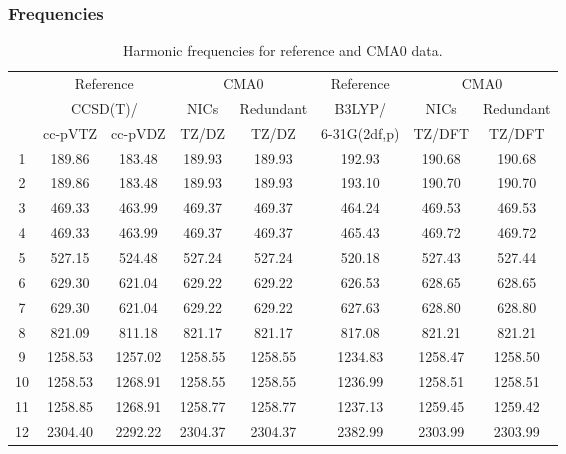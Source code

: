 \documentclass[10pt,oneside]{article}
\begin{document}
\begin{table}[h!]
\subsubsection*{Frequencies}
\centering
\caption{Harmonic frequencies for reference and CMA0 data.}
\begin{tabular}{cccccccc}
\toprule
{} & \multicolumn{2}{c}{Reference} & \multicolumn{2}{c}{CMA0} &    Reference & \multicolumn{2}{c}{CMA0} \\
{} & \multicolumn{2}{c}{CCSD(T)/} &    NICs &  Redundant &       B3LYP/ &    NICs & Redundant \\
{} &   cc-pVTZ & cc-pVDZ &   TZ/DZ &      TZ/DZ & 6-31G(2df,p) &  TZ/DFT &    TZ/DFT \\
\midrule
1  &    189.86 &  183.48 &  189.93 &     189.93 &       192.93 &  190.68 &    190.68 \\
2  &    189.86 &  183.48 &  189.93 &     189.93 &       193.10 &  190.70 &    190.70 \\
3  &    469.33 &  463.99 &  469.37 &     469.37 &       464.24 &  469.53 &    469.53 \\
4  &    469.33 &  463.99 &  469.37 &     469.37 &       465.43 &  469.72 &    469.72 \\
5  &    527.15 &  524.48 &  527.24 &     527.24 &       520.18 &  527.43 &    527.44 \\
6  &    629.30 &  621.04 &  629.22 &     629.22 &       626.53 &  628.65 &    628.65 \\
7  &    629.30 &  621.04 &  629.22 &     629.22 &       627.63 &  628.80 &    628.80 \\
8  &    821.09 &  811.18 &  821.17 &     821.17 &       817.08 &  821.21 &    821.21 \\
9  &   1258.53 & 1257.02 & 1258.55 &    1258.55 &      1234.83 & 1258.47 &   1258.50 \\
10 &   1258.53 & 1268.91 & 1258.55 &    1258.55 &      1236.99 & 1258.51 &   1258.51 \\
11 &   1258.85 & 1268.91 & 1258.77 &    1258.77 &      1237.13 & 1259.45 &   1259.42 \\
12 &   2304.40 & 2292.22 & 2304.37 &    2304.37 &      2382.99 & 2303.99 &   2303.99 \\
\bottomrule
\end{tabular}
\end{table}
\end{document}
